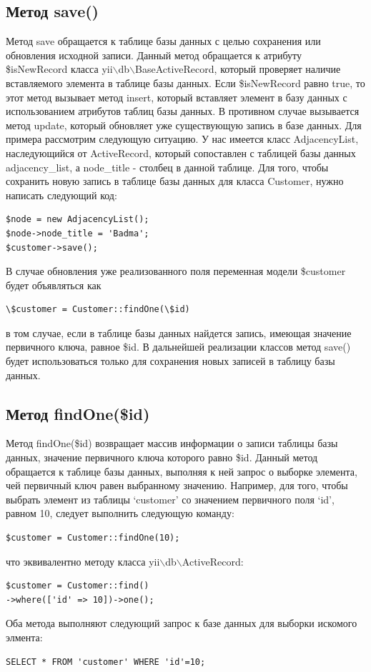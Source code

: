 \documentclass[a4paper,14pt]{extreport}
\theoremstyle{definition}
\begin{document}
\subsection{Метод save()}
Метод save обращается к таблице базы данных с целью сохранения или обновления исходной записи. Данный метод обращается к атрибуту \$isNewRecord класса yii$\backslash$db$\backslash$BaseActiveRecord, который проверяет наличие вставляемого элемента в таблице базы данных. Если \$isNewRecord равно true, то этот метод вызывает метод insert, который вставляет элемент в базу данных с использованием атрибутов таблиц базы данных. В противном случае вызывается метод update, который обновляет уже существующую запись в базе данных.
Для примера рассмотрим следующую ситуацию. У нас имеется класс AdjacencyList, наследующийся от ActiveRecord, который сопоставлен с таблицей базы данных adjacency\_list, а node\_title - столбец в данной таблице. Для того, чтобы сохранить новую запись в таблице базы данных для класса Customer, нужно написать следующий код:\begin{verbatim}
$node = new AdjacencyList();
$node->node_title = 'Badma';
$customer->save();
\end{verbatim}В случае обновления уже реализованного поля переменная модели \$customer будет объявляться как \begin{verbatim}\$customer = Customer::findOne(\$id)\end{verbatim} в том случае, если в таблице базы данных найдется запись, имеющая значение первичного ключа, равное \$id.
В дальнейшей реализации классов метод save() будет использоваться только для сохранения новых записей в таблицу базы данных.
\subsection{Метод findOne(\$id)}
Метод findOne(\$id) возвращает массив информации о записи таблицы базы данных, значение первичного ключа которого равно \$id. Данный метод обращается к таблице базы данных, выполняя к ней запрос о выборке элемента, чей первичный ключ равен выбранному значению.
Например, для того, чтобы выбрать элемент из таблицы ‘customer’ со значением первичного поля ‘id’, равном 10, следует выполнить следующую команду:
\begin{verbatim}$customer = Customer::findOne(10);\end{verbatim}
что эквивалентно методу класса yii$\backslash$db$\backslash$ActiveRecord:
\begin{verbatim}$customer = Customer::find()
->where(['id' => 10])->one();\end{verbatim}Оба метода выполняют следующий запрос к базе данных для выборки искомого элмента:
\begin{verbatim}SELECT * FROM 'customer' WHERE 'id'=10;\end{verbatim}
\end{document}
